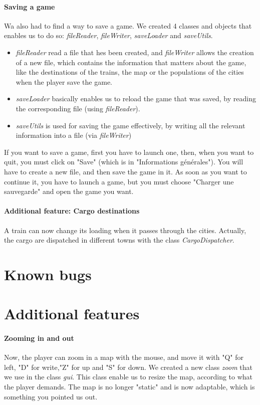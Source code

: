\documentclass[a4paper]{article}
\begin{document}
	\paragraph{Saving a game} 
	Wa also had to find a way to save a game. We created 4 classes and objects that enables us to do so: \textit{fileReader}, \textit{fileWriter}, \textit{saveLoader} and \textit{saveUtils}.
	\begin{itemize}
		\item \textit{fileReader} read a file that hes been created, and \textit{fileWriter} allows the creation of a new file, which contains the information that matters about the game, like the destinations of the trains, the map or the populations of the cities when the player save the game.
		\item \textit{saveLoader} basically enables us to reload the game that was saved, by reading the corresponding file (using \textit{fileReader}).
		\item  \textit{saveUtils} is used for saving the game effectively, by writing all the relevant information into a file (via \textit{fileWriter})
	\end{itemize}
	If you want to save a game, first you have to launch one, then, when you want to quit, you must click on "Save" (which is in "Informations générales"). You will have to create a new file, and then save the game in it.
	As soon as you want to continue it, you have to launch a game, but you must choose "Charger une sauvegarde" and open the game you want.

	\paragraph{Additional feature: Cargo destinations}
	A train can now change its loading when it passes through the cities. Actually, the cargo are dispatched in different towns with the class \textit{CargoDispatcher}. 
	
	\section{Known bugs}
	
	\section{Additional features}
	\paragraph{Zooming in and out}
	Now, the player can zoom in a map with the mouse, and move it with "Q" for left, "D" for write,"Z" for up and "S" for down. We created a new class \textit{zoom} that we use in the class \textit{gui}. This class enable us to resize the map, according to what the player demands. The map is no longer "static" and is now adaptable, which is something you pointed us out.
	
	
	
\end{document}
